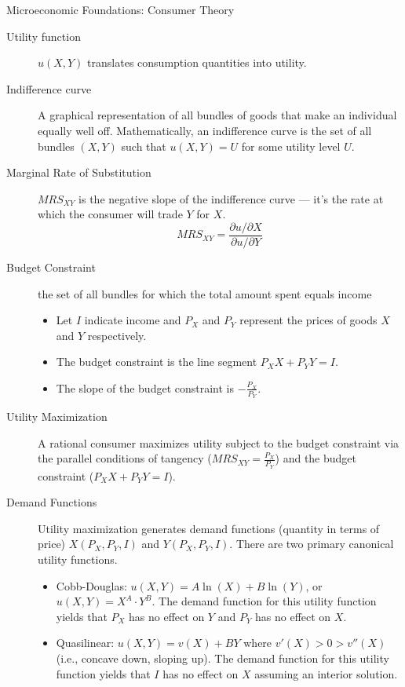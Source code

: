 \documentclass[10pt]{extarticle}
\begin{document}
  \begin{problem}{Microeconomic Foundations: Consumer Theory}
    \begin{description}
      \item[Utility function] $u(X,Y)$ translates consumption quantities into utility.
      \item[Indifference curve] A graphical representation of all bundles of goods that make an individual equally well off. Mathematically, an indifference curve is the set of all bundles $(X,Y)$ such that $u(X,Y) = U$ for some utility level $U$.
      \item[Marginal Rate of Substitution] $MRS_{XY}$ is the negative slope of the indifference curve --- it's the rate at which the consumer will trade $Y$ for $X$.
        \[
          MRS_{XY} = \frac{\partial u/\partial X}{\partial u/\partial Y}
        \] 
      \item[Budget Constraint] the set of all bundles for which the total amount spent equals income
        \begin{itemize}
          \item Let $I$ indicate income and $P_X$ and $P_Y$ represent the prices of goods $X$ and $Y$ respectively.
          \item The budget constraint is the line segment $P_X X + P_Y Y = I$.
          \item The slope of the budget constraint is $-\frac{P_X}{P_Y}$.
        \end{itemize}
      \item[Utility Maximization] A rational consumer maximizes utility subject to the budget constraint via the parallel conditions of tangency ($MRS_{XY} = \frac{P_X}{P_Y}$) and the budget constraint ($P_X X + P_Y Y = I$).
      \item[Demand Functions] Utility maximization generates demand functions (quantity in terms of price) $X(P_X,P_Y,I)$ and $Y(P_X,P_Y,I)$. There are two primary canonical utility functions.
        \begin{itemize}
          \item Cobb-Douglas: $u(X,Y) = A\ln(X) + B\ln(Y)$, or $u(X,Y) = X^A \cdot Y^B$. The demand function for this utility function yields that $P_X$ has no effect on $Y$ and $P_Y$ has no effect on $X$.
          \item Quasilinear: $u(X,Y) = v(X) + BY$ where $v'(X)>0>v''(X)$ (i.e., concave down, sloping up). The demand function for this utility function yields that $I$ has no effect on $X$ assuming an interior solution.

\end{itemize}
\end{description}
\end{problem}
\end{document}
